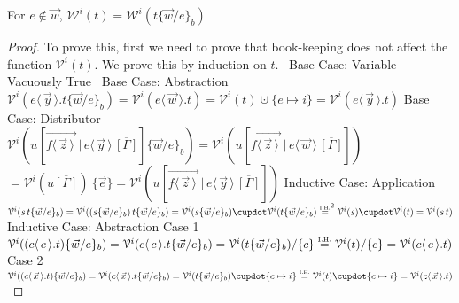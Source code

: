 \documentclass[a4paper,UKenglish,cleveref, autoref]{lipics-v2019}
\newcommand{\set}[1]{ \{ #1 \} }
\newcommand{\app}[2]{#1 \, #2}
\newcommand{\fake}[3]{#1 \langle \, #2 \, \rangle . #3}
\newcommand{\dist}[5]{#1 [ #2 \, \vert \, \fakedist{#4}{#5} \, #3 ]}
\newcommand{\fakedist}[2]{#1 \langle \, #2 \, \rangle}
\newcommand{\vecdist}[2]{\overrightarrow{\fakedist{#1}{#2} \,}}
\newcommand{\psub}[3]{#1 \{ #2 / #3 \}_{b}}
\newcommand{\weight}[2]{\mathcal{W}^{#1}(#2)}
\newcommand{\weightvar}[2]{\mathcal{V}^{#1}(#2)}
\newcommand{\IH}{\stackrel{\hbox{\tiny I.H.}}{\hbox{=}}}
\begin{document}
\begin{proposition}
\label{prop:bkweight}
For $e \not\in \vec{w}$, $\weight{i}{t} = \weight{i}{\psub{t}{\vec{w}}{e}}$
\end{proposition}
\begin{proof}
To prove this, first we need to prove that book-keeping does not affect the function $\weightvar{i}{t}$. We prove this by induction on $t$.
\newline
{\ Base Case: Variable}
\newline
Vacuously True
\newline
\newline
{\ Base Case: Abstraction}
\newline
$\weightvar{i}{\fake{e}{\vec{y}}{t} \psub{}{\vec{w}}{e}} = \weightvar{i}{\fake{e}{\vec{w}}{t}} = \weightvar{i}{t} \cupdot \set{e \mapsto i} = \weightvar{i}{\fake{e}{\vec{y}}{t}}$
\newline
\newline
{ Base Case: Distributor}
\newline
$\weightvar{i}{\dist{u}{\vecdist{f}{\vec{z}}}{\overline{[\Gamma]}}{e}{\vec{y}} \psub{}{\vec{w}}{e}} = \weightvar{i}{\dist{u}{\vecdist{f}{\vec{z}}}{\overline{[\Gamma]}}{e}{\vec{w}}}$
\newline
$ = \weightvar{i}{u\overline{[\Gamma]}} \ \set{\vec{e}} = \weightvar{i}{\dist{u}{\vecdist{f}{\vec{z}}}{\overline{[\Gamma]}}{e}{\vec{y}}}$
\newline
\newline
{ Inductive Case: Application}
\newline
$\weightvar{i}{\app{s}{t} \psub{}{\vec{w}}{e}} = \weightvar{i}{\app{(s \psub{}{\vec{w}}{e})}{t \psub{}{\vec{w}}{e}}} = \weightvar{i}{s \psub{}{\vec{w}}{e}} \cupdot \weightvar{i}{t \psub{}{\vec{w}}{e}} \IH^{2} \weightvar{i}{s} \cupdot \weightvar{i}{t} = \weightvar{i}{\app{s}{t}}$
\newline
\newline
{ Inductive Case: Abstraction}
\newline
Case 1
\newline
$\weightvar{i}{(\fake{c}{c}{t}) \psub{}{\vec{w}}{e}} = \weightvar{i}{\fake{c}{c}{t  \psub{}{\vec{w}}{e} }} = \weightvar{i}{t \psub{}{\vec{w}}{e}} / \set{c} \IH \weightvar{i}{t} / \set{c} = \weightvar{i}{\fake{c}{c}{t}}$
\newline
Case 2
\newline
$\weightvar{i}{(\fake{c}{\vec{x}}{t}) \psub{}{\vec{w}}{e}} = \weightvar{i}{\fake{c}{\vec{x}}{t  \psub{}{\vec{w}}{e} }} = \weightvar{i}{t \psub{}{\vec{w}}{e}} \cupdot \set{c \mapsto i} \IH \weightvar{i}{t} \cupdot \set{c \mapsto i} = \weightvar{i}{\fake{c}{\vec{x}}{t}}$

\end{proof}
\end{document}
